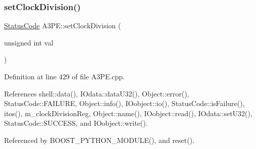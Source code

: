 \subsubsection{\texorpdfstring{set\+Clock\+Division()}{setClockDivision()}}
{\footnotesize\ttfamily \hyperlink{classStatusCode}{Status\+Code} A3\+P\+E\+::set\+Clock\+Division (\begin{DoxyParamCaption}\item[{unsigned int}]{val }\end{DoxyParamCaption})}



Definition at line 429 of file A3\+P\+E.\+cpp.



References shell\+::data(), I\+Odata\+::data\+U32(), Object\+::error(), Status\+Code\+::\+F\+A\+I\+L\+U\+RE, Object\+::info(), I\+Oobject\+::io(), Status\+Code\+::is\+Failure(), itos(), m\+\_\+clock\+Division\+Reg, Object\+::name(), I\+Oobject\+::read(), I\+Odata\+::set\+U32(), Status\+Code\+::\+S\+U\+C\+C\+E\+SS, and I\+Oobject\+::write().



Referenced by B\+O\+O\+S\+T\+\_\+\+P\+Y\+T\+H\+O\+N\+\_\+\+M\+O\+D\+U\+L\+E(), and reset().


